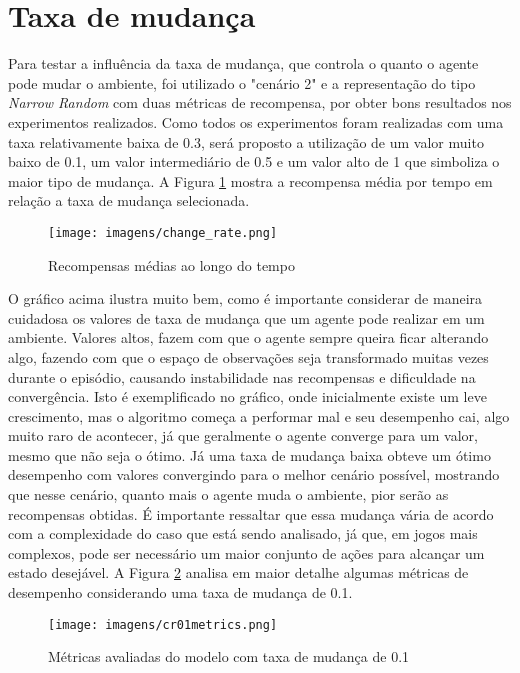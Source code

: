\section{Taxa de mudança}
Para testar a influência da taxa de mudança, que controla o quanto o agente pode mudar o ambiente, foi utilizado o "cenário 2" e 
a representação do tipo \textit{Narrow Random} com duas métricas de recompensa, por obter bons resultados nos experimentos realizados.
Como todos os experimentos foram realizadas com uma taxa relativamente baixa de 0.3, será 
proposto a utilização de um valor muito baixo de 0.1, um valor intermediário de 0.5 e um valor alto 
de 1 que simboliza o maior tipo de mudança. A Figura \ref{change_rate} mostra a recompensa média por tempo em relação a taxa de mudança
selecionada.

\begin{figure}[htb]
	\caption{\label{change_rate}Recompensas médias ao longo do tempo}
	\begin{center}
	    \texttt{[image: imagens/change\_rate.png]}
	\end{center}
\end{figure}

\FloatBarrier

O gráfico acima ilustra muito bem, como é importante considerar de maneira cuidadosa os valores de taxa de mudança que um agente 
pode realizar em um ambiente. Valores altos, fazem com que o agente sempre queira ficar alterando algo, fazendo com que o 
espaço de observações seja transformado muitas vezes durante o episódio, causando instabilidade nas recompensas e 
dificuldade na convergência. Isto é
exemplificado no gráfico, onde inicialmente existe um leve crescimento, mas o algoritmo começa a performar mal e 
seu desempenho cai, algo muito raro de acontecer, já que geralmente o agente converge para um valor, mesmo que não seja
o ótimo. Já uma taxa de mudança baixa obteve um ótimo desempenho com valores convergindo para o melhor cenário possível,
mostrando que nesse cenário, quanto mais o agente muda o ambiente, pior serão as recompensas obtidas. É importante ressaltar
que essa mudança vária de acordo com a complexidade do caso que está sendo analisado, já que, em jogos mais complexos, pode
ser necessário um maior conjunto de ações para alcançar um estado desejável. A Figura \ref{cr01metrics} analisa em
maior detalhe algumas métricas de desempenho considerando uma taxa de mudança de 0.1.
\begin{figure}[htb]
	\caption{\label{cr01metrics}Métricas avaliadas do modelo com taxa de mudança de 0.1}
	\begin{center}
	    \texttt{[image: imagens/cr01metrics.png]}
	\end{center}
\end{figure}

